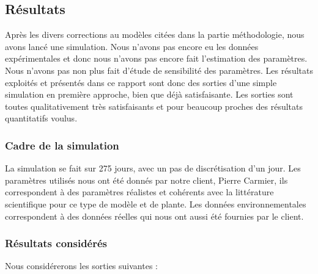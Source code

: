 \subsection{Résultats}

Après les divers corrections au modèles citées dans la partie méthodologie, nous avons lancé une simulation. 
Nous n'avons pas encore eu les données expérimentales et donc nous n'avons pas encore fait l'estimation des paramètres. Nous n'avons pas non plus fait d'étude de sensibilité des paramètres. 
Les résultats exploités et présentés dans ce rapport sont donc des sorties d'une simple simulation en première approche, bien que déjà satisfaisante. Les sorties sont toutes qualitativement très satisfaisants et pour beaucoup proches des résultats quantitatifs voulus. 

\subsubsection{Cadre de la simulation}

La simulation se fait sur 275 jours, avec un pas de discrétisation d'un jour. Les paramètres utilisés nous ont été donnés par notre client, Pierre Carmier, ils correspondent à des paramètres réalistes et cohérents avec la littérature scientifique pour ce type de modèle et de plante. Les données environnementales correspondent à des données réelles qui nous ont aussi été fournies par le client.


\subsubsection{Résultats considérés}

Nous considérerons les sorties suivantes :

